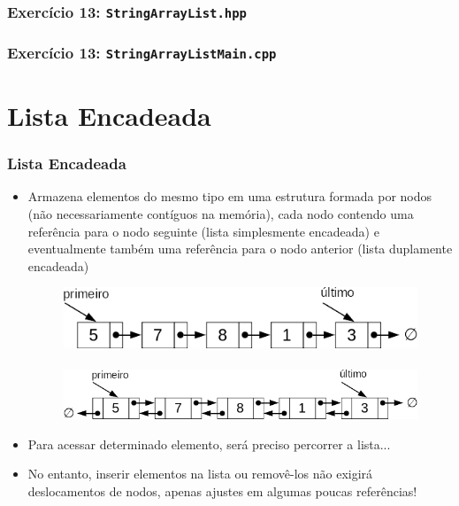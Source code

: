 \documentclass[aspectratio=169]{beamer}
\begin{document}
\begin{frame}[fragile]\frametitle{Exercício 13: \texttt{StringArrayList.hpp}}
\fontsize{6pt}{6pt}\selectfont{

}
\end{frame}

\begin{frame}[fragile]\frametitle{Exercício 13: \texttt{StringArrayListMain.cpp}}
\fontsize{3pt}{5pt}\selectfont{

}
\end{frame}

\section{Lista Encadeada}

\begin{frame}\frametitle{Lista Encadeada}
\begin{itemize}
	\item Armazena elementos do mesmo tipo em uma estrutura formada por nodos (não necessariamente contíguos na memória), cada nodo contendo uma referência para o nodo seguinte (lista simplesmente encadeada) e eventualmente também uma referência para o nodo anterior (lista duplamente encadeada)
\begin{figure}[h]
	\centering
	\includegraphics[height=0.12\paperheight]{imagens/lista_simplesmente_encadeada.png} ~ \includegraphics[height=0.12\paperheight]{imagens/lista_duplamente_encadeada.png}
\end{figure}
	\item Para acessar determinado elemento, será preciso percorrer a lista...
	\item No entanto, inserir elementos na lista ou removê-los não exigirá deslocamentos de nodos, apenas ajustes em algumas poucas referências!
\end{itemize}
\end{frame}
\end{document}
